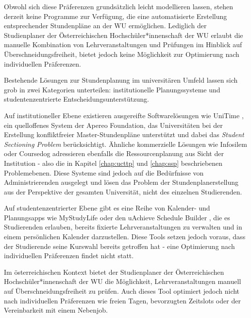 Obwohl sich diese Präferenzen grundsätzlich leicht modellieren lassen, stehen derzeit keine Programme zur Verfügung, die eine automatisierte Erstellung entsprechender Stundenpläne an der WU ermöglichen. Lediglich der Studienplaner der Österreichischen Hochschüler*innenschaft der WU \cite{studienplaner-oeh} erlaubt die manuelle Kombination von Lehrveranstaltungen und Prüfungen im Hinblick auf Überschneidungsfreiheit, bietet jedoch keine Möglichkeit zur Optimierung nach individuellen Präferenzen.




Bestehende Lösungen zur Stundenplanung im universitären Umfeld lassen sich grob in zwei Kategorien unterteilen: institutionelle Planungssysteme und studentenzentrierte Entscheidungsunterstützung.

Auf institutioneller Ebene existieren ausgereifte Softwarelösungen wie UniTime \cite{unitime,muller-2010}, ein quelloffenes System der Apereo Foundation, das Universitäten bei der Erstellung konfliktfreier Master-Stundenpläne unterstützt und dabei das \textit{Student Sectioning Problem} berücksichtigt. Ähnliche kommerzielle Lösungen wie Infosilem \cite{app-infosilem} oder Coursedog \cite{app-coursedog} adressieren ebenfalls die Ressourcenplanung aus Sicht der Institution - also die in Kapitel \ref{chap:ucttp} und \ref{chap:ssp} beschriebenen Problemebenen. Diese Systeme sind jedoch auf die Bedürfnisse von Administrierenden ausgelegt und lösen das Problem der Stundenplanerstellung aus der Perspektive der gesamten Universität, nicht des einzelnen Studierenden.

Auf studentenzentrierter Ebene gibt es eine Reihe von Kalender- und Planungsapps wie MyStudyLife \cite{app-mystudylife} oder den uAchieve Schedule Builder \cite{app-uachieve}, die es Studierenden erlauben, bereits fixierte Lehrveranstaltungen zu verwalten und in einem persönlichen Kalender darzustellen. Diese Tools setzen jedoch voraus, dass der Studierende seine Kurswahl bereits getroffen hat - eine Optimierung nach individuellen Präferenzen findet nicht statt.

Im österreichischen Kontext bietet der Studienplaner der Österreichischen Hochschüler*innenschaft der WU \cite{studienplaner-oeh} die Möglichkeit, Lehrveranstaltungen manuell auf Überschneidungsfreiheit zu prüfen. Auch dieses Tool optimiert jedoch nicht nach individuellen Präferenzen wie freien Tagen, bevorzugten Zeitslots oder der Vereinbarkeit mit einem Nebenjob.

